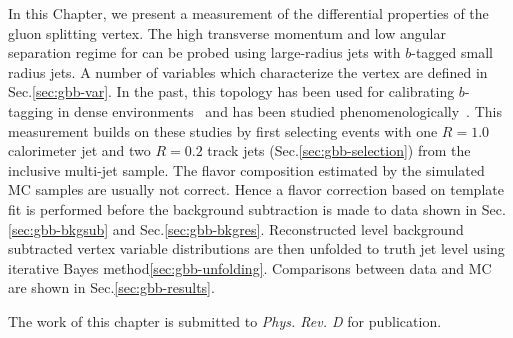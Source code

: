 In this Chapter, we present a measurement of the differential properties of the gluon splitting vertex. The high transverse momentum and low angular separation regime for \gbb can be probed using large-radius jets with $b$-tagged small radius jets. A number of variables which characterize the \gbb vertex are defined in Sec.\ref{sec:gbb-var}. In the past, this topology has been used for calibrating $b$-tagging in dense environments~\cite{ATLAS-CONF-2016-039,ATLAS-CONF-2016-002,CMS:2013vea} and has been studied phenomenologically~\cite{Anderle:2017qwx,Ilten:2017rbd}. This measurement builds on these studies by first selecting events with one $R=1.0$ calorimeter jet and two $R=0.2$ track jets (Sec.\ref{sec:gbb-selection}) from the inclusive multi-jet sample. The flavor composition estimated by the simulated MC samples are usually not correct. Hence a flavor correction based on \sdzero template fit is performed before the background subtraction is made to data shown in Sec.\ref{sec:gbb-bkgsub} and Sec.\ref{sec:gbb-bkgres}. Reconstructed level background subtracted \gbb vertex variable distributions are then unfolded to truth jet level using iterative Bayes method\ref{sec:gbb-unfolding}. Comparisons between data and MC are shown in Sec.\ref{sec:gbb-results}.

The work of this chapter is submitted to \textit{Phys. Rev. D} for publication.
